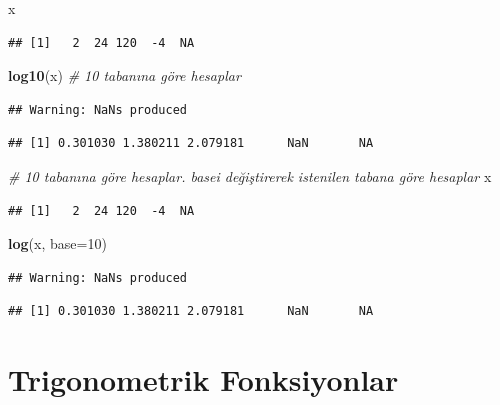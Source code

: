\documentclass[
]{book}
\newenvironment{Shaded}{\begin{snugshade}}{\end{snugshade}}
\newcommand{\AttributeTok}[1]{\textcolor[rgb]{0.13,0.29,0.53}{#1}}
\newcommand{\CommentTok}[1]{\textcolor[rgb]{0.56,0.35,0.01}{\textit{#1}}}
\newcommand{\DecValTok}[1]{\textcolor[rgb]{0.00,0.00,0.81}{#1}}
\newcommand{\FunctionTok}[1]{\textcolor[rgb]{0.13,0.29,0.53}{\textbf{#1}}}
\newcommand{\NormalTok}[1]{#1}
\begin{document}
\begin{Shaded}
\begin{Highlighting}[]
\NormalTok{x}
\end{Highlighting}
\end{Shaded}

\begin{verbatim}
## [1]   2  24 120  -4  NA
\end{verbatim}

\begin{Shaded}
\begin{Highlighting}[]
\FunctionTok{log10}\NormalTok{(x) }\CommentTok{\# 10 tabanına göre hesaplar}
\end{Highlighting}
\end{Shaded}

\begin{verbatim}
## Warning: NaNs produced
\end{verbatim}

\begin{verbatim}
## [1] 0.301030 1.380211 2.079181      NaN       NA
\end{verbatim}

\begin{Shaded}
\begin{Highlighting}[]
\CommentTok{\# 10 tabanına göre hesaplar. base\textquotesingle{}i değiştirerek istenilen tabana göre hesaplar}
\NormalTok{x}
\end{Highlighting}
\end{Shaded}

\begin{verbatim}
## [1]   2  24 120  -4  NA
\end{verbatim}

\begin{Shaded}
\begin{Highlighting}[]
\FunctionTok{log}\NormalTok{(x, }\AttributeTok{base=}\DecValTok{10}\NormalTok{) }
\end{Highlighting}
\end{Shaded}

\begin{verbatim}
## Warning: NaNs produced
\end{verbatim}

\begin{verbatim}
## [1] 0.301030 1.380211 2.079181      NaN       NA
\end{verbatim}

\section{Trigonometrik Fonksiyonlar}\label{trigonometrik-fonksiyonlar}
\end{document}
